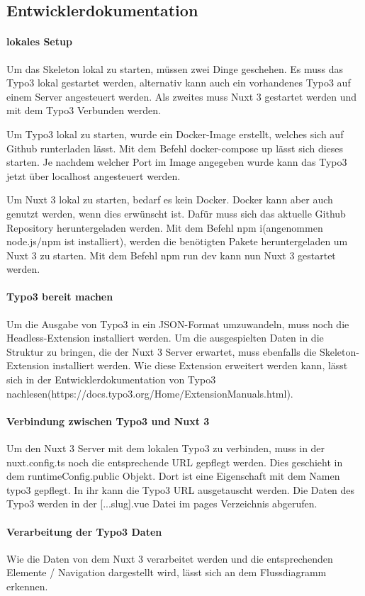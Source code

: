 \subsection{Entwicklerdokumentation}
\label{app:Doc}

\paragraph{lokales Setup}

Um das Skeleton lokal zu starten, müssen zwei Dinge geschehen. Es muss das Typo3 lokal gestartet werden, alternativ kann auch ein vorhandenes Typo3 auf einem Server angesteuert werden. Als zweites muss Nuxt 3 gestartet werden und mit dem Typo3 Verbunden werden. 

Um Typo3 lokal zu starten, wurde ein Docker-Image erstellt, welches sich auf Github runterladen lässt. Mit dem Befehl docker-compose up lässt sich dieses starten. Je nachdem welcher Port im Image angegeben wurde kann das Typo3 jetzt über localhost angesteuert werden.

Um Nuxt 3 lokal zu starten, bedarf es kein Docker. Docker kann aber auch genutzt werden, wenn dies erwünscht ist. Dafür muss sich das aktuelle Github Repository heruntergeladen werden. Mit dem Befehl npm i(angenommen node.js/npm ist installiert), werden die benötigten Pakete heruntergeladen um Nuxt 3 zu starten. Mit dem Befehl npm run dev kann nun Nuxt 3 gestartet werden.

\paragraph{Typo3 bereit machen}

Um die Ausgabe von Typo3 in ein JSON-Format umzuwandeln, muss noch die Headless-Extension installiert werden. Um die ausgespielten Daten in die Struktur zu bringen, die der Nuxt 3 Server erwartet, muss ebenfalls die Skeleton-Extension installiert werden. Wie diese Extension erweitert werden kann, lässt sich in der Entwicklerdokumentation von Typo3 nachlesen(https://docs.typo3.org/Home/ExtensionManuals.html).

\paragraph{Verbindung zwischen Typo3 und Nuxt 3}

Um den Nuxt 3 Server mit dem lokalen Typo3 zu verbinden, muss in der nuxt.config.ts noch die entsprechende URL gepflegt werden. Dies geschieht in dem runtimeConfig.public Objekt. Dort ist eine Eigenschaft mit dem Namen typo3 gepflegt. In ihr kann die Typo3 URL ausgetauscht werden. Die Daten des Typo3 werden in der [...slug].vue Datei im pages Verzeichnis abgerufen.

\paragraph{Verarbeitung der Typo3 Daten}

Wie die Daten von dem Nuxt 3 verarbeitet werden und die entsprechenden Elemente / Navigation dargestellt wird, lässt sich an dem Flussdiagramm erkennen.
